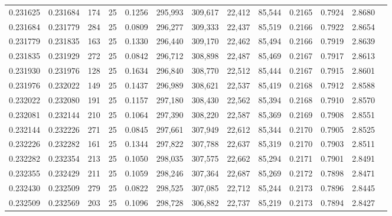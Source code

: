 \begin{tabular}{rrrrrrrrrrrrr}
0.231625 & 0.231684 &   174 &  25 &                                     0.1256 & 295,993 & 309,617 &  22,412 &  85,544 & 0.2165 & 0.7924 & 2.8680 \\
0.231684 & 0.231779 &   284 &  25 &                                     0.0809 & 296,277 & 309,333 &  22,437 &  85,519 & 0.2166 & 0.7922 & 2.8654 \\
0.231779 & 0.231835 &   163 &  25 &                                     0.1330 & 296,440 & 309,170 &  22,462 &  85,494 & 0.2166 & 0.7919 & 2.8639 \\
0.231835 & 0.231929 &   272 &  25 &                                     0.0842 & 296,712 & 308,898 &  22,487 &  85,469 & 0.2167 & 0.7917 & 2.8613 \\
0.231930 & 0.231976 &   128 &  25 &                                     0.1634 & 296,840 & 308,770 &  22,512 &  85,444 & 0.2167 & 0.7915 & 2.8601 \\
0.231976 & 0.232022 &   149 &  25 &                                     0.1437 & 296,989 & 308,621 &  22,537 &  85,419 & 0.2168 & 0.7912 & 2.8588 \\
0.232022 & 0.232080 &   191 &  25 &                                     0.1157 & 297,180 & 308,430 &  22,562 &  85,394 & 0.2168 & 0.7910 & 2.8570 \\
0.232081 & 0.232144 &   210 &  25 &                                     0.1064 & 297,390 & 308,220 &  22,587 &  85,369 & 0.2169 & 0.7908 & 2.8551 \\
0.232144 & 0.232226 &   271 &  25 &                                     0.0845 & 297,661 & 307,949 &  22,612 &  85,344 & 0.2170 & 0.7905 & 2.8525 \\
0.232226 & 0.232282 &   161 &  25 &                                     0.1344 & 297,822 & 307,788 &  22,637 &  85,319 & 0.2170 & 0.7903 & 2.8511 \\
0.232282 & 0.232354 &   213 &  25 &                                     0.1050 & 298,035 & 307,575 &  22,662 &  85,294 & 0.2171 & 0.7901 & 2.8491 \\
0.232355 & 0.232429 &   211 &  25 &                                     0.1059 & 298,246 & 307,364 &  22,687 &  85,269 & 0.2172 & 0.7898 & 2.8471 \\
0.232430 & 0.232509 &   279 &  25 &                                     0.0822 & 298,525 & 307,085 &  22,712 &  85,244 & 0.2173 & 0.7896 & 2.8445 \\
0.232509 & 0.232569 &   203 &  25 &                                     0.1096 & 298,728 & 306,882 &  22,737 &  85,219 & 0.2173 & 0.7894 & 2.8427 \\

\end{tabular}
